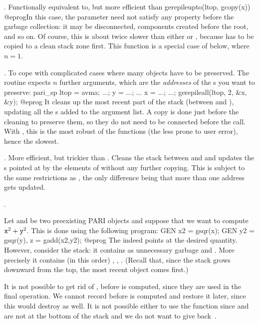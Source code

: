 . Functionally equivalent to,
but more efficient than
\bprog
  gerepileupto(ltop, gcopy(x))
@eprog\noindent In this case, the  parameter  need not
satisfy any property before the garbage collection: it may be disconnected,
components created before the root, and so on. Of course, this is about
twice slower than either  or , because
 has to be copied to a clean stack zone first. This function is a
special case of  below, where $n=1$.

.
To cope with complicated cases where many objects have to be preserved. The
routine expects $n$ further arguments, which are the \emph{addresses} of
the s you want to preserve:
\bprog
  pari_sp ltop = avma;
  ...; y = ...; ... x = ...; ...;
  gerepileall(ltop, 2, &x, &y);
@eprog\noindent
It cleans up the most recent part of the
stack (between  and ), updating all the s added
to the argument list. A copy is done just before the cleaning to preserve
them, so they do not need to be connected before the call. With
, this is the most robust of the  functions
(the less prone to user error), hence the slowest.

.
More efficient, but trickier than . Cleans the stack between
 and  and updates the s pointed at by the
elements of  without any further copying. This is subject to the
same restrictions as , the only difference being that more than
one address gets updated.

.


Let  and  be two preexisting PARI objects and suppose that we
want to compute ${\tt x}^2 + {\tt y}^2$. This is done using the following
program:
\bprog
  GEN x2 = gsqr(x);
  GEN y2 = gsqr(y), z = gadd(x2,y2);
@eprog\noindent
The   indeed points at the desired quantity. However,
consider the stack: it contains as unnecessary garbage  and .
More precisely it contains (in this order) , , .
(Recall that, since the stack grows downward from the top, the most recent
object comes first.)

It is not possible to get rid of ,  before  is
computed, since they are used in the final operation. We cannot record
 before  is computed and restore it later, since this would
destroy  as well. It is not possible either to use the function
 since  and  are not at the bottom of the stack and
we do not want to give back~.

